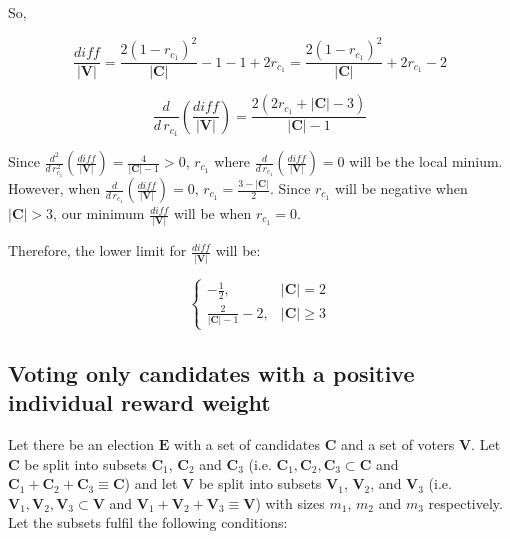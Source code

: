 \documentclass{article}
\begin{document}
So, 

\begin{equation}
    \frac{diff}{|\boldsymbol{V}|} = \frac{2(1-r_{c_1})^2}{|\boldsymbol{C}|} - 1 - 1 + 2r_{c_1} = \frac{2(1-r_{c_1})^2}{|\boldsymbol{C}|} + 2r_{c_1} - 2
\end{equation}

\begin{equation}
    \frac{d}{d\, r_{c_1}}\left( \frac{diff}{|\boldsymbol{V}|} \right) = \frac{2(2r_{c_1} + |\boldsymbol{C}| - 3)}{|\boldsymbol{C}| - 1}
\end{equation}

Since $\frac{d^2}{d\, r_{c_1}^2}\left( \frac{diff}{|\boldsymbol{V}|} \right) = \frac{4}{|\boldsymbol{C}| - 1} > 0$, $r_{c_1}$ where $\frac{d}{d\, r_{c_1}}\left( \frac{diff}{|\boldsymbol{V}|} \right) = 0$ will be the local minium. However, when $\frac{d}{d\, r_{c_1}}\left( \frac{diff}{|\boldsymbol{V}|} \right) = 0$, $r_{c_1} = \frac{3-|\boldsymbol{C}|}{2}$. Since $r_{c_1}$ will be negative when $|\boldsymbol{C}| > 3$, our minimum $\frac{diff}{|\boldsymbol{V}|}$ will be when $r_{c_1} = 0$.

Therefore, the lower limit for $\frac{diff}{|\boldsymbol{V}|}$ will be:

\begin{equation}
\begin{cases}
    -\frac{1}{2}, & |\boldsymbol{C}| = 2\\
    \frac{2}{|\boldsymbol{C}|-1} - 2, & |\boldsymbol{C}| \geq 3
\end{cases}
\end{equation}


\subsection{Voting only candidates with a positive individual reward weight}

Let there be an election $\boldsymbol{E}$ with a set of candidates $\boldsymbol{C}$ and a set of voters $\boldsymbol{V}$. 
Let $\boldsymbol{C}$ be split into subsets $\boldsymbol{C}_{1}$, $\boldsymbol{C}_{2}$ and $\boldsymbol{C}_{3}$ (i.e. $\boldsymbol{C}_{1}, \boldsymbol{C}_{2}, \boldsymbol{C}_{3} \subset \boldsymbol{C}$ and $\boldsymbol{C}_{1}+\boldsymbol{C}_{2}+\boldsymbol{C}_{3} \equiv \boldsymbol{C}$) and let $\boldsymbol{V}$ be split into subsets $\boldsymbol{V}_{1}$, $\boldsymbol{V}_{2}$, and $\boldsymbol{V}_{3}$ (i.e. $\boldsymbol{V}_{1}, \boldsymbol{V}_{2}, \boldsymbol{V}_{3} \subset \boldsymbol{V}$ and $\boldsymbol{V}_{1}+\boldsymbol{V}_{2}+\boldsymbol{V}_{3} \equiv \boldsymbol{V}$) with sizes ${m}_{1}$, ${m}_{2}$ and ${m}_{3}$ respectively.
Let the subsets fulfil the following conditions:\\
\end{document}
